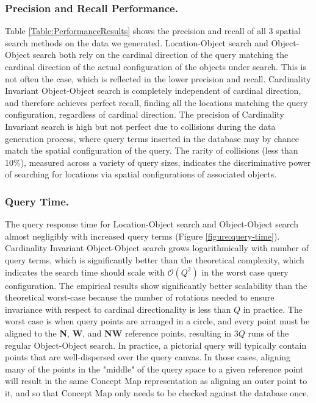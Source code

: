 \subsubsection{Precision and Recall Performance.} 
Table \ref{Table:PerformanceResults} shows the precision and recall of all 3 spatial search methods on the data we generated.
Location-Object search and Object-Object search both rely on the cardinal direction of the query matching the cardinal direction of the actual configuration of the objects under search.
This is not often the case, which is reflected in the lower precision and recall.
Cardinality Invariant Object-Object search is completely independent of cardinal direction, and therefore achieves perfect recall, finding all the locations matching the query configuration, regardless of cardinal direction.
The precision of Cardinality Invariant search is high but not perfect due to collisions during the data generation process, where query terms inserted in the database may by chance match the spatial configuration of the query.
The rarity of collisions (less than 10\%), measured across a variety of query sizes, indicates the discriminative power of searching for locations via spatial configurations of associated objects.

\subsubsection{Query Time.}
The query response time for Location-Object search and Object-Object search almost negligibly with increased query terms (Figure \ref{figure:query-time}).
Cardinality Invariant Object-Object search grows logarithmically with number of query terms, which is significantly better than the theoretical complexity, which indicates the search time should scale with $\mathcal{O}(Q^2)$ in the worst case query configuration.
The empirical results show significantly better scalability than the theoretical worst-case because the number of rotations needed to ensure invariance with respect to cardinal directionality is less than $Q$ in practice. 
The worst case is when query points are arranged in a circle, and every point must be aligned to the \textbf{N}, \textbf{W}, and \textbf{NW} reference points, resulting in $3Q$ runs of the regular Object-Object search.
In practice, a pictorial query will typically contain points that are well-dispersed over the query canvas.
In those cases, aligning many of the points in the "middle" of the query space to a given reference point will result in the same Concept Map representation as aligning an outer point to it, and so that Concept Map only needs to be checked against the database once.


